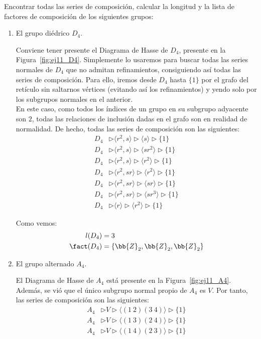 \begin{ejercicio}
    Encontrar todas las series de composición, calcular la longitud y la lista de factores de composición de los siguientes grupos:
    \begin{enumerate}
        \item El grupo diédrico $D_4$.
        
        Conviene tener presente el Diagrama de Hasse de $D_4$, presente en la Figura~\ref{fig:ej11_D4}. Simplemente lo usaremos para buscar todas las series normales de $D_4$ que no admitan refinamientos, consiguiendo así todas las series de composición. Para ello, iremos desde $D_4$ hasta $\{1\}$ por el grafo del retículo sin saltarnos vértices (evitando así los refinamientos) y yendo solo por los subgrupos normales en el anterior.\\

        En este caso, como todos los índices de un grupo en su subgrupo adyacente son $2$, todas las relaciones de inclusión dadas en el grafo son en realidad de normalidad. De hecho, todas las series de composición son las siguientes:
        \begin{align*}
            D_4 &\rhd \langle r^2, s \rangle \rhd  \langle s \rangle  \rhd \{1\} \\
            D_4 &\rhd \langle r^2, s \rangle \rhd \langle sr^2 \rangle  \rhd \{1\} \\
            D_4 &\rhd \langle r^2, s \rangle \rhd \langle r^2 \rangle  \rhd \{1\} \\
            D_4 &\rhd \langle r^2, sr \rangle  \rhd \langle r^2 \rangle  \rhd \{1\} \\
            D_4 &\rhd \langle r^2, sr \rangle  \rhd \langle sr \rangle  \rhd \{1\} \\
            D_4 &\rhd \langle r^2, sr \rangle  \rhd \langle sr^3 \rangle  \rhd \{1\} \\
            D_4 &\rhd \langle r \rangle \rhd \langle r^2 \rangle  \rhd \{1\}
        \end{align*}

        Como vemos:
        \begin{align*}
            l(D_4) &= 3 \\
            \fact(D_4) &= \{\bb{Z}_2, \bb{Z}_2, \bb{Z}_2\}
        \end{align*}
        \item El grupo alternado $A_4$.
        
        El Diagrama de Hasse de $A_4$ está presente en la Figura~\ref{fig:ej11_A4}. Además, se vió que el único subgrupo normal propio de $A_4$ es $V$. Por tanto, las series de composición son las siguientes:
        \begin{align*}
            A_4 &\rhd V \rhd \langle (1\ 2)(3\ 4) \rangle  \rhd \{1\} \\
            A_4 &\rhd V \rhd \langle (1\ 3)(2\ 4) \rangle  \rhd \{1\} \\
            A_4 &\rhd V \rhd \langle (1\ 4)(2\ 3) \rangle  \rhd \{1\}
        \end{align*}


\end{enumerate}
\end{ejercicio}
